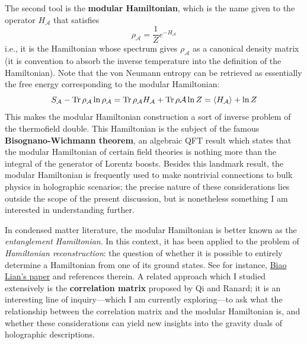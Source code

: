 \documentclass{report}
\begin{document}
The second tool is the \textbf{modular Hamiltonian}, which is the name given 
to the operator $ H_{\mathcal{A}} $ that satisfies 
\begin{equation*}
	\rho_\mathcal{A}
		= \frac{1}{Z}e^{-H_\mathcal{A}}
\end{equation*}
i.e., it is the Hamiltonian whose spectrum gives $ \rho_{\mathcal{A}} $ as a canonical density 
matrix (it is convention to absorb the inverse temperature into the definition 
of the Hamiltonian). Note that the von Neumann entropy can be retrieved as 
essentially the free energy corresponding to the modular Hamiltonian:
\begin{equation*}
	S_{\mathcal{A}}
	-\Tr \rho_\mathcal{A} \ln \rho_\mathcal{A} 
		= \Tr \rho_\mathcal{A} H_\mathcal{A}
			+ \Tr \rho\mathcal{A} \ln Z
		= \langle H_\mathcal{A} \rangle + \ln Z
\end{equation*}
This makes the modular Hamiltonian construction a sort of inverse problem of 
the thermofield double. This Hamiltonian is the subject of the famous
\textbf{Bisognano-Wichmann theorem}, an algebraic QFT result which states that
the modular Hamiltonian of certain field theories is nothing more than the
integral of the generator of Lorentz boosts. Besides this landmark result, the
modular Hamiltonian is frequently used to make nontrivial connections to bulk
physics in holographic scenarios; the precise nature of these considerations
lies outside the scope of the present discussion, but is nonetheless something I
am interested in understanding further.

In condensed matter literature, the modular Hamiltonian is better known as the 
\textit{entanglement Hamiltonian}. In this context, it has been applied to the 
problem of \textit{Hamiltonian reconstruction}: the question of whether it 
is possible to entirely determine a Hamiltonian from one of its ground states. 
See for instance, \href{https://journals.aps.org/prb/abstract/10.1103/PhysRevB.105.035106}{Biao Lian's paper} 
and references therein. A related approach which I studied extensively is the 
\textbf{correlation matrix} proposed by Qi and Ranard; it is an interesting 
line of inquiry---which I am currently exploring---to ask what the relationship 
between the correlation matrix and the modular Hamiltonian is, and whether 
these considerations can yield new insights into the gravity duals of holographic 
descriptions. 
\end{document}
